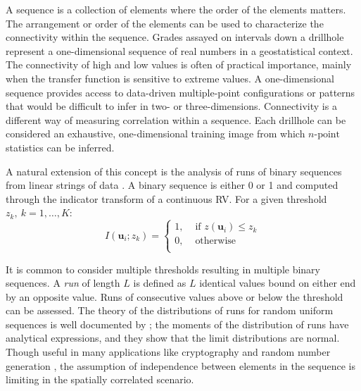 A sequence is a collection of elements where the order of the elements matters. The arrangement or order of the elements can be used to characterize the connectivity within the sequence. Grades assayed on intervals down a drillhole represent a one-dimensional sequence of real numbers in a geostatistical context. The connectivity of high and low values is often of practical importance, mainly when the transfer function is sensitive to extreme values. A one-dimensional sequence provides access to data-driven multiple-point configurations or patterns that would be difficult to infer in two- or three-dimensions. Connectivity is a different way of measuring correlation within a sequence. Each drillhole can be considered an exhaustive, one-dimensional training image from which $n\text{-point}$ statistics can be inferred.

A natural extension of this concept is the analysis of runs of binary sequences from linear strings of data \citep{ortiz2003characterization}. A binary sequence is either 0 or 1 and computed through the indicator transform of a continuous \gls{RV}. For a given threshold $z_{k}, \ k=1,\dots,K$:
\begin{equation}
    I(\mathbf{u}_{i};z_{k}) =
    \begin{cases}
        1, & \text{ if }z(\mathbf{u}_{i}) \leq z_{k} \\
        0, & \text{ otherwise }                      \\
    \end{cases}
    \label{eq:indicator}
\end{equation}

It is common to consider multiple thresholds resulting in multiple binary sequences. A \textit{run} of length $L$ is defined as $L$ identical values bound on either end by an opposite value. Runs of consecutive values above or below the threshold can be assessed. The theory of the distributions of runs for random uniform sequences is well documented by \cite{fu2003distribution}; the moments of the distribution of runs have analytical expressions, and they show that the limit distributions are normal. Though useful in many applications like cryptography and random number generation \citep{rukhin2010statistical}, the assumption of independence between elements in the sequence is limiting in the spatially correlated scenario.

